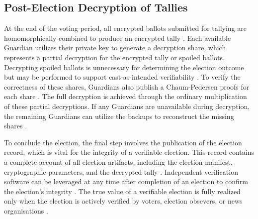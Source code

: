 \subsection{Post-Election Decryption of Tallies}
At the end of the voting period, all encrypted ballots submitted for tallying are homomorphically combined to produce an encrypted tally \cite[5,18]{eg-spec} \cite[15]{eg-paper}. Each available Guardian utilizes their private key to generate a decryption share, which represents a partial decryption for the encrypted tally or spoiled ballots. Decrypting spoiled ballots is unnecessary for determining the election outcome but may be performed to support cast-as-intended verifiability \cite[15,17]{eg-paper} \cite[18]{eg-spec}. To verify the correctness of these shares, Guardians also publish a Chaum-Pedersen proofs for each share \cite[18]{eg-spec}. The full decryption is achieved through the ordinary multiplication of these partial decryptions. If any Guardians are unavailable during decryption, the remaining Guardians can utilize the backups to reconstruct the missing shares \cite{eg-docs}.

To conclude the election, the final step involves the publication of the election record, which is vital for the integrity of a verifiable election. This record contains a complete account of all election artifacts, including the election manifest, cryptographic parameters, and the decrypted tally \cite[24]{eg-spec}. Independent verification software can be leveraged at any time after completion of an election to confirm the election's integrity \cite[6]{eg-paper}. The true value of a verifiable election is fully realized only when the election is actively verified by voters, election obsevers, or news organisations \cite[17]{eg-spec}. 


